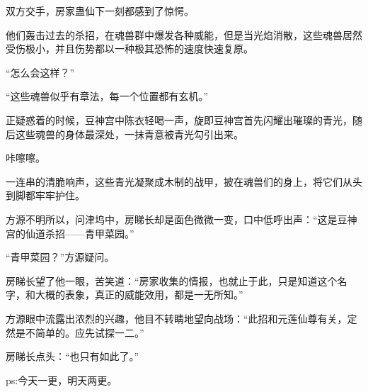 \begin{this_body}
双方交手，房家蛊仙下一刻都感到了惊愕。

他们轰击过去的杀招，在魂兽群中爆发各种威能，但是当光焰消散，这些魂兽居然受伤极小，并且伤势都以一种极其恐怖的速度快速复原。

“怎么会这样？”

“这些魂兽似乎有章法，每一个位置都有玄机。”

正疑惑着的时候，豆神宫中陈衣轻喝一声，旋即豆神宫首先闪耀出璀璨的青光，随后这些魂兽的身体最深处，一抹青意被青光勾引出来。

咔嚓嚓。

一连串的清脆响声，这些青光凝聚成木制的战甲，披在魂兽们的身上，将它们从头到脚都牢牢护住。

方源不明所以，问津坞中，房睇长却是面色微微一变，口中低呼出声：“这是豆神宫的仙道杀招——青甲菜园。”

“青甲菜园？”方源疑问。

房睇长望了他一眼，苦笑道：“房家收集的情报，也就止于此，只是知道这个名字，和大概的表象，真正的威能效用，都是一无所知。”

方源眼中流露出浓烈的兴趣，他目不转睛地望向战场：“此招和元莲仙尊有关，定然是不简单的。应先试探一二。”

房睇长点头：“也只有如此了。”

ps:今天一更，明天两更。

\end{this_body}

